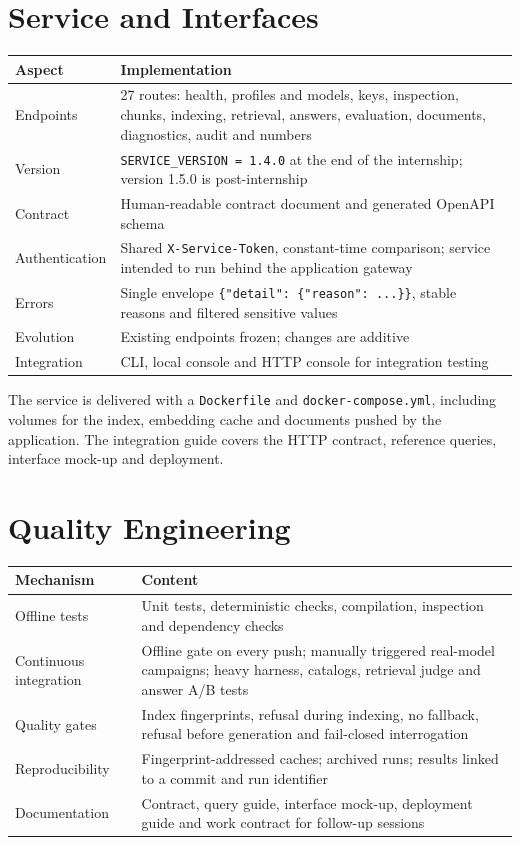 \documentclass[a4paper,12pt,openany]{report}
\begin{document}
\section{Service and Interfaces}
\begin{table}[htbp]
\centering
\small
\begin{tabular}{p{3.4cm}p{11.1cm}}
\toprule
\textbf{Aspect} & \textbf{Implementation} \\
\midrule
Endpoints & 27 routes: health, profiles and models, keys, inspection, chunks, indexing, retrieval,
answers, evaluation, documents, diagnostics, audit and numbers \\
Version & \texttt{SERVICE\_VERSION = 1.4.0} at the end of the internship; version 1.5.0 is
post-internship \\
Contract & Human-readable contract document and generated OpenAPI schema \\
Authentication & Shared \texttt{X-Service-Token}, constant-time comparison; service intended to run
behind the application gateway \\
Errors & Single envelope \texttt{\{"detail": \{"reason": ...\}\}}, stable reasons and filtered
sensitive values \\
Evolution & Existing endpoints frozen; changes are additive \\
Integration & CLI, local console and HTTP console for integration testing \\
\bottomrule
\end{tabular}
\end{table}

The service is delivered with a \texttt{Dockerfile} and \texttt{docker-compose.yml}, including
volumes for the index, embedding cache and documents pushed by the application. The integration
guide covers the HTTP contract, reference queries, interface mock-up and deployment.

\section{Quality Engineering}
\begin{table}[htbp]
\centering
\small
\begin{tabular}{p{3.4cm}p{11.1cm}}
\toprule
\textbf{Mechanism} & \textbf{Content} \\
\midrule
Offline tests & Unit tests, deterministic checks, compilation, inspection and dependency checks \\
Continuous integration & Offline gate on every push; manually triggered real-model campaigns; heavy
harness, catalogs, retrieval judge and answer A/B tests \\
Quality gates & Index fingerprints, refusal during indexing, no fallback, refusal before generation
and fail-closed interrogation \\
Reproducibility & Fingerprint-addressed caches; archived runs; results linked to a commit and run
identifier \\
Documentation & Contract, query guide, interface mock-up, deployment guide and work contract for
follow-up sessions \\
\bottomrule
\end{tabular}
\end{table}
\end{document}

